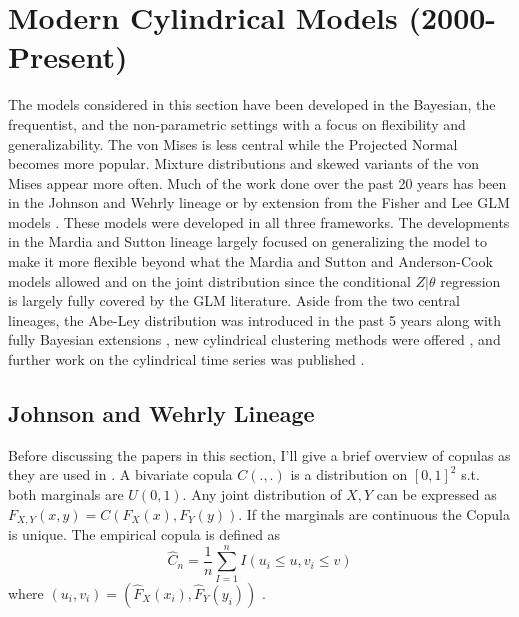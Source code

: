 \section{Modern Cylindrical Models (2000-Present)}\label{mod_sec}

The models considered in this section have been developed in the Bayesian, the frequentist, and the non-parametric settings with a focus on flexibility and generalizability. The von Mises is less central while the Projected Normal becomes more popular. Mixture distributions and skewed variants of the von Mises appear more often. Much of the work done over the past 20 years has been in the Johnson and Wehrly lineage \cite{johnson_angular-linear_1978} or by extension from the Fisher and Lee GLM models \cite{fisher_regression_1992}\cite{fernandez-duran_models_2007}\cite{carnicero_non-parametric_2013} \cite{garcia-portugues_exploring_2013}\cite{nunez-antonio_bayesian_2011}\cite{mulder_bayesian_2017}. These models were developed in all three frameworks. The developments in the Mardia and Sutton lineage \cite{mardia_model_1978} largely focused on generalizing the model to make it more flexible beyond what the Mardia and Sutton \cite{mardia_model_1978} and Anderson-Cook models \cite{anderson-cook_extension_1997}\cite{anderson-cook_second_2000} allowed and on the joint distribution since the conditional $Z|\theta$ regression is largely fully covered by the GLM literature. Aside from the two central lineages, the Abe-Ley distribution was introduced in the past 5 years along with fully Bayesian extensions \cite{abe_tractable_2017}\cite{sadeghianpourhamami_bayesian_2019}, new cylindrical clustering methods were offered \cite{}, and further work on the cylindrical time series was published \cite{lagona_hidden_2015}.

\subsection{Johnson and Wehrly Lineage}\label{mod_JW}

Before discussing the papers in this section, I'll give a brief overview of copulas as they are used in \cite{fernandez-duran_models_2007}\cite{garcia-portugues_exploring_2013}\cite{carnicero_non-parametric_2013}. A bivariate copula $C(.,.)$ is a distribution on $[0,1]^2$ s.t. both marginals are $U(0,1)$. Any joint distribution of $X,Y$ can be expressed as $F_{X,Y}(x,y) = C(F_X(x), F_Y(y))$. If the marginals are continuous the Copula is unique. The empirical copula is defined as  \[\hat{C}_n = \frac{1}{n} \sum_{I=1}^n I(u_i \leq u, v_i \leq v)\] where $(u_i, v_i) = (\hat{F}_X(x_i), \hat{F}_Y(y_i))$ \cite{carnicero_non-parametric_2013}. 


